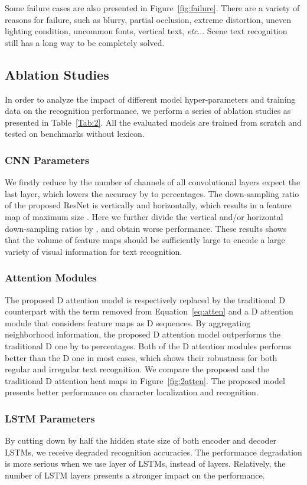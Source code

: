 \documentclass[letterpaper]{article} \usepackage{aaai19}  \usepackage{times}  \usepackage{helvet}  \usepackage{courier}  \usepackage{url}  \usepackage{graphicx}  \usepackage{amsmath}
\makeatletter
\DeclareRobustCommand\onedot{\futurelet\@let@token\@onedot}
\def\@onedot{\ifx\@let@token.\else.\null\fi\xspace}
\def\etc{\emph{etc}\onedot} \def\vs{\emph{vs}\onedot}
\makeatother
\begin{document}
Some failure cases are also presented in Figure~\ref{fig:failure}.
There are a variety of reasons for failure, such as blurry, partial occlusion, extreme distortion, uneven lighting condition, uncommon fonts, vertical text, \etc.
Scene text recognition still has a long way to be completely solved.

\subsection{Ablation Studies}

In order to analyze the impact of different model hyper-parameters and training data on the recognition performance, we perform a series of ablation studies as presented in Table~\ref{Tab:2}.
All the evaluated models are trained from scratch and tested on benchmarks without lexicon.

\subsubsection{\bf CNN Parameters}
We firstly reduce by  the number of channels of all convolutional layers expect the last layer, which lowers the accuracy by  to  percentages.
The down-sampling ratio of the proposed ResNet is  vertically and  horizontally, which results in a feature map of maximum size .
Here we further divide the vertical and/or horizontal down-sampling ratios by , and obtain worse performance.
These results shows that the volume of feature maps should be sufficiently large to encode a large variety of visual information for text recognition.


\subsubsection{\bf Attention Modules}
The proposed D attention model is respectively replaced by the traditional D counterpart with the term  removed from Equation~\eqref{eq:atten} and a D attention module that considers feature maps as D sequences.
By aggregating neighborhood information, the proposed D attention model outperforms the traditional D one by  to  percentages.
Both of the D attention modules performs better than the D one in most cases, which shows their robustness for both regular and irregular text recognition.
We compare the proposed and the traditional D attention heat maps in Figure~\ref{fig:2atten}.
The proposed model presents better performance on character localization and recognition.

\subsubsection{\bf LSTM Parameters}
By cutting down by half the hidden state size of both encoder and decoder LSTMs, we receive degraded recognition accuracies. The performance degradation is more serious when we use  layer of LSTMs, instead of  layers.
Relatively, the number of LSTM layers presents a stronger impact on the performance.
\end{document}
